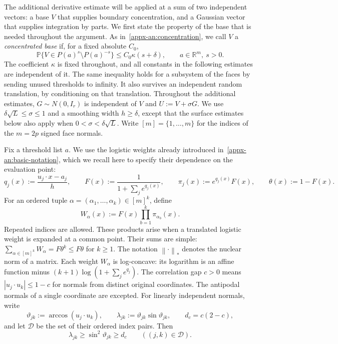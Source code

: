 \documentclass[11pt,letterpaper,twoside,leqno]{article}
\theoremstyle{bookplain}
\theoremstyle{bookremark}
\newcommand{\Pp}{\mathbb P}
\newcommand{\R}{\mathbb R}
\newcommand{\cD}{\mathcal D}
\newcommand{\norm}[1]{\left\lVert#1\right\rVert}
\begin{document}
The additional derivative estimate will be applied at a sum of two
independent vectors: a base $V$ that supplies boundary concentration,
and a Gaussian vector that supplies integration by parts. We first
state the property of the base that is needed throughout the argument.
As in~\eqref{appx-an:concentration}, we call $V$ a
\emph{concentrated base} if, for a fixed absolute $C_0$,
\begin{equation}\label{hgap:eq:ac}
 \Pp\{V\in P(a)^s\setminus P(a)^{-s}\}
       \le C_0\kappa(s+\delta),
       \qquad a\in\R^m,\ s>0.
\end{equation}
The coefficient $\kappa$ is fixed throughout, and all constants in
the following estimates are independent of it. The same inequality holds
for a subsystem of the faces by sending
unused thresholds to infinity. It also survives an independent random
translation, by conditioning on that translation. Throughout the
additional estimates, $G\sim N(0,I_r)$ is independent of $V$ and
$U:=V+\sigma G$. We use
\(\delta\sqrt L\le\sigma\le1\) and a smoothing width \(h\ge\delta\),
except that the surface estimates below also apply when
\(0<\sigma<\delta\sqrt L\). Write \([m]=\{1,\ldots,m\}\) for the
indices of the \(m=2p\) signed face normals.

Fix a threshold list $a$. We use the logistic weights already introduced
in~\eqref{appx-an:basic-notation}, which we recall here to specify their
dependence on the evaluation point:
\[
 q_j(x):=\frac{u_j\cdot x-a_j}{h},\qquad
 F(x):=\frac1{1+\sum_j e^{q_j(x)}},\qquad
 \pi_j(x):=e^{q_j(x)}F(x),\qquad \theta(x):=1-F(x).
\]
For an ordered tuple $\alpha=(\alpha_1,\ldots,\alpha_k)\in[m]^k$, define
\[
 W_\alpha(x):=F(x)\prod_{b=1}^k\pi_{\alpha_b}(x).
\]
Repeated indices are allowed. These products arise when a translated
logistic weight is expanded at a common point. Their sums are simple:
$\sum_{\alpha\in[m]^k}W_\alpha=F\theta^k\le F\theta$ for $k\ge1$.
The notation $\norm{\cdot}_*$ denotes the nuclear norm of a matrix.
Each weight $W_\alpha$ is log-concave: its logarithm is an affine
function minus $(k+1)\log(1+\sum_j e^{q_j})$.
The correlation gap $c>0$ means
$|u_j\cdot u_k|\le1-c$ for normals from distinct original coordinates.
The antipodal normals of a single coordinate are excepted. For
linearly independent normals, write
\[
 \vartheta_{jk}:=\arccos(u_j\cdot u_k),\qquad
 \lambda_{jk}:=\vartheta_{jk}\sin\vartheta_{jk},\qquad
 d_c=c(2-c),
\]
and let $\cD$ be the set of their ordered index pairs. Then
\begin{equation}
 \lambda_{jk}\ge\sin^2\vartheta_{jk}\ge d_c
 \qquad((j,k)\in\cD).
 \label{hgap:eq:gap}
\end{equation}
\end{document}
